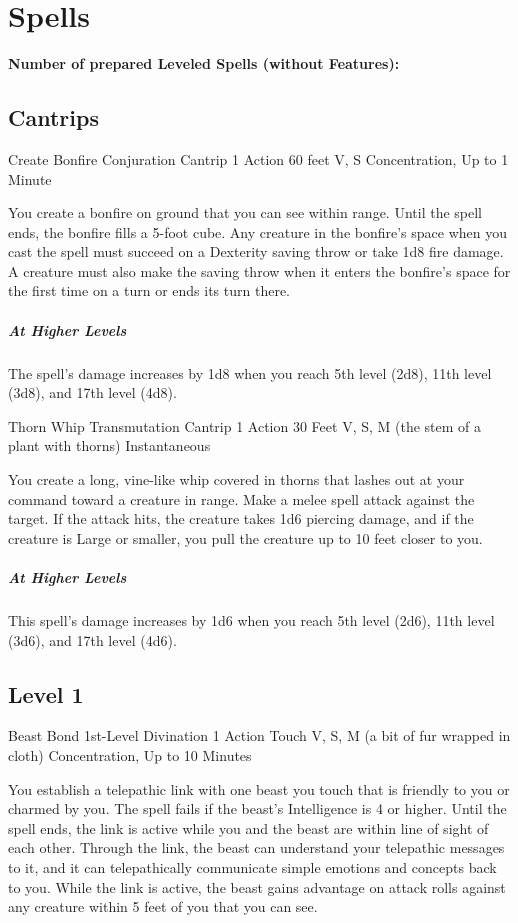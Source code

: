 \documentclass[letterpaper,openany,oneside,twocolumn]{book}
\begin{document}
\vfill\eject
\section*{Spells}
\textbf{Number of prepared Leveled Spells (without Features):} \intcalcAdd{\calculateModifier{\WisdomScoreValue}}{\LevelValue}
\subsection*{Cantrips}

\DndSpellHeader
  {Create Bonfire}
  {Conjuration Cantrip}
  {1 Action}
  {60 feet}
  {V, S}
  {Concentration, Up to 1 Minute}

You create a bonfire on ground that you can see within range. Until the spell ends, the bonfire fills a 5-foot cube. Any creature in the bonfire's space when you cast the spell must succeed on a Dexterity saving throw or take 1d8 fire damage. A creature must also make the saving throw when it enters the bonfire's space for the first time on a turn or ends its turn there.

\subparagraph*{At Higher Levels} The spell's damage increases by 1d8 when you reach 5th level (2d8), 11th level (3d8), and 17th level (4d8).

\DndSpellHeader
  {Thorn Whip}
  {Transmutation Cantrip}
  {1 Action}
  {30 Feet}
  {V, S, M (the stem of a plant with thorns)}
  {Instantaneous}

You create a long, vine-like whip covered in thorns that lashes out at your command toward a creature in range. Make a melee spell attack against the target. If the attack hits, the creature takes 1d6 piercing damage, and if the creature is Large or smaller, you pull the creature up to 10 feet closer to you.

\subparagraph*{At Higher Levels} This spell's damage increases by 1d6 when you reach 5th level (2d6), 11th level (3d6), and 17th level (4d6).

\subsection*{Level 1}

\DndSpellHeader
  {Beast Bond}
  {1st-Level Divination}
  {1 Action}
  {Touch}
  {V, S, M (a bit of fur wrapped in cloth)}
  {Concentration, Up to 10 Minutes}

You establish a telepathic link with one beast you touch that is friendly to you or charmed by you. The spell fails if the beast's Intelligence is 4 or higher. Until the spell ends, the link is active while you and the beast are within line of sight of each other. Through the link, the beast can understand your telepathic messages to it, and it can telepathically communicate simple emotions and concepts back to you. While the link is active, the beast gains advantage on attack rolls against any creature within 5 feet of you that you can see.
\end{document}
